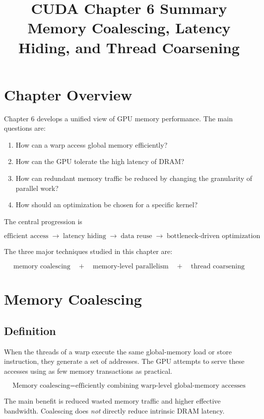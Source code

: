 \documentclass[11pt]{article}
\title{\textbf{CUDA Chapter 6 Summary}\\
Memory Coalescing, Latency Hiding, and Thread Coarsening}
\author{}
\date{}
\begin{document}
\maketitle

\section{Chapter Overview}

Chapter 6 develops a unified view of GPU memory performance. The main questions are:

\begin{enumerate}[leftmargin=2em]
    \item How can a warp access global memory efficiently?
    \item How can the GPU tolerate the high latency of DRAM?
    \item How can redundant memory traffic be reduced by changing the granularity of parallel work?
    \item How should an optimization be chosen for a specific kernel?
\end{enumerate}

The central progression is

\[
\boxed{
\text{efficient access}
\;\rightarrow\;
\text{latency hiding}
\;\rightarrow\;
\text{data reuse}
\;\rightarrow\;
\text{bottleneck-driven optimization}
}
\]

The three major techniques studied in this chapter are:

\[
\boxed{
\text{memory coalescing}
\quad+\quad
\text{memory-level parallelism}
\quad+\quad
\text{thread coarsening}
}
\]

\section{Memory Coalescing}

\subsection{Definition}

When the threads of a warp execute the same global-memory load or store instruction, they generate a set of addresses. The GPU attempts to serve these accesses using as few memory transactions as practical.

\[
\boxed{
\text{Memory coalescing}
=
\text{efficiently combining warp-level global-memory accesses}
}
\]

The main benefit is reduced wasted memory traffic and higher effective bandwidth. Coalescing does \emph{not} directly reduce intrinsic DRAM latency.
\end{document}

